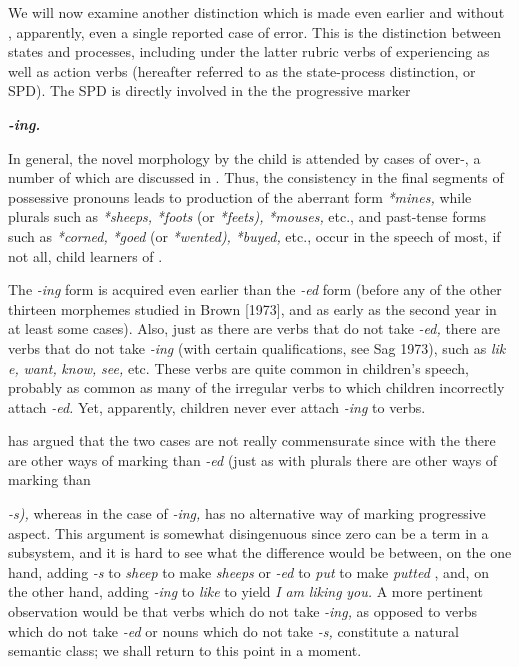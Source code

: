 We will now examine another distinction which is made even earlier and without , apparently, even a single reported case of error. This is the distinction between states and processes, including under the latter rubric verbs of experiencing as well as action verbs (hereafter referred to as the state-process distinction, or SPD). The SPD is di\-rectly involved in the  the  progressive marker

\textbf{\textit{{}-ing.}}



In general, the  novel morphology by the child is attended by cases of over-, a number of which are dis\-cussed in \citet{Cazden1968}. Thus, the consistency in the final segments of possessive pronouns leads to production of the aberrant form \textit{*mines,} while plurals such as \textit{*sheeps,} \textit{*foots} (or \textit{*feets}\textit{),} \textit{*mouses,} etc., and past-tense forms such as \textit{*corned,} \textit{*goed} (or \textit{*wented}\textit{),} \textit{*buyed, }etc., occur in the speech of most, if not all, child learners of .

The \textit{{}-i}\textit{n}\textit{g }form is acquired even earlier than the \textit{{}-ed} form (before
any of the other thirteen morphemes studied in Brown [1973], and as early as the second year in at least some cases). Also, just as there are verbs that do not take \textit{{}-ed,} there are verbs that do not take \textit{{}-ing} (with certain qualifications, see Sag 1973), such as \textit{lik} \textit{e,} \textit{want,} \textit{know,} \textit{see,} etc. These verbs are quite common in children's speech, probably as common as many of the irregular verbs to which children incor\-rectly attach \textit{{}-ed.} Yet, apparently, children never ever attach \textit{{}-ing} to  verbs.

\citet{Kuczaj1978} has argued that the two cases are not really commensurate since with the  there are other ways of mark\-ing than \textit{{}-ed }(just as with plurals there are other ways of marking than

\textit{{}-}\textit{s}\textit{),} whereas in the case of \textit{{}-ing,}  has no alternative way of marking progressive aspect. This argument is somewhat disingenuous since zero can be a term in a subsystem, and it is hard to see what the difference would be between, on the one hand, adding \textit{{}-s} to \textit{sheep }to make \textit{sheeps} or \textit{{}-ed} to \textit{put} to make \textit{putted} , and, on the other hand, adding \textit{{}-ing} to \textit{like} to yield \textit{I} \textit{am} \textit{liking} \textit{you. }A more pertinent observa\-tion would be that verbs which do not take \textit{{}-ing,} as opposed to verbs which do not take \textit{{}-ed} or nouns which do not take \textit{{}-s,} constitute a natural semantic class; we shall return to this point in a moment.

